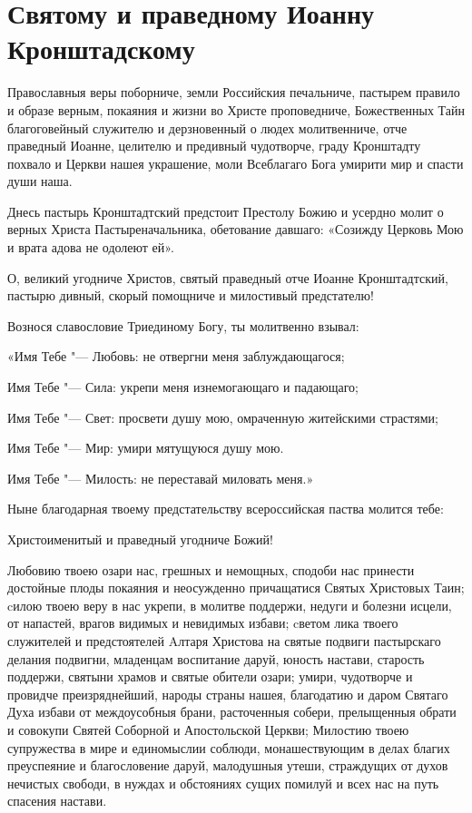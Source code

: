 \section{Святому и праведному Иоанну Кронштадскому}\begin{mymulticols}


Православныя веры поборниче, земли Российския печальниче, пастырем правило и образе верным, покаяния и жизни во Христе проповедниче, Божественных Тайн благоговейный служителю и дерзновенный о людех молитвенниче, отче праведный Иоанне, целителю и предивный чудотворче, граду Кронштадту похвало и Церкви нашея украшение, моли Всеблагаго Бога умирити мир и спасти души наша.


Днесь пастырь Кронштадтский предстоит Престолу Божию и усердно молит о верных Христа Пастыреначальника, обетование давшаго: «Созижду Церковь Мою и врата адова не одолеют ей».


О, великий угодниче Христов, святый праведный отче Иоанне Кронштадтский, пастырю дивный, скорый помощниче и милостивый предстателю! 

Вознося славословие Триединому Богу, ты молитвенно взывал: 


«Имя Тебе "--- Любовь: не отвергни меня заблуждающагося;

Имя Тебе "--- Сила: укрепи меня изнемогающаго и падающаго;

Имя Тебе "--- Свет: просвети душу мою, омраченную житейскими страстями;

Имя Тебе "--- Мир: умири мятущуюся душу мою.

Имя Тебе "--- Милость: не переставай миловать меня.»


Ныне благодарная твоему предстательству всероссийская паства молится тебе: 

Христоименитый и праведный угодниче Божий! 

Любовию твоею озари нас, грешных и немощных, сподоби нас принести достойные плоды покаяния и неосужденно причащатися Святых Христовых Таин; cилою твоею веру в нас укрепи, в молитве поддержи, недуги и болезни исцели, от напастей, врагов видимых и невидимых избави; cветом лика твоего служителей и предстоятелей Aлтаря Христова на святые подвиги пастырскаго делания подвигни, младенцам воспитание даруй, юность настави, старость поддержи, святыни храмов и святые обители озари; умири, чудотворче и провидче преизряднейший, народы страны нашея, благодатию и даром Святаго Духа избави от междоусобныя брани, расточенныя собери, прелыщенныя обрати и совокупи Святей Соборной и Апостольской Церкви; Милостию твоею супружества в мире и единомыслии соблюди, монашествующим в делах благих преуспеяние и благословение даруй, малодушныя утеши, страждущих от духов нечистых свободи, в нуждах и обстояниях сущих помилуй и всех нас на путь спасения настави. 


\end{mymulticols}
